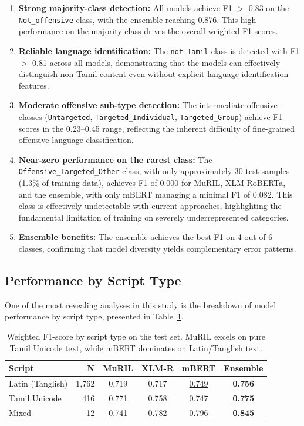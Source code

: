\documentclass[12pt, a4paper]{article}
\begin{document}
\begin{enumerate}[leftmargin=2em]
    \item \textbf{Strong majority-class detection:} All models achieve F1 $>$ 0.83 on the \texttt{Not\_offensive} class, with the ensemble reaching 0.876. This high performance on the majority class drives the overall weighted F1-scores.
    
    \item \textbf{Reliable language identification:} The \texttt{not-Tamil} class is detected with F1 $>$ 0.81 across all models, demonstrating that the models can effectively distinguish non-Tamil content even without explicit language identification features.
    
    \item \textbf{Moderate offensive sub-type detection:} The intermediate offensive classes (\texttt{Untargeted}, \texttt{Targeted\_Individual}, \texttt{Targeted\_Group}) achieve F1-scores in the 0.23--0.45 range, reflecting the inherent difficulty of fine-grained offensive language classification.
    
    \item \textbf{Near-zero performance on the rarest class:} The \texttt{Offensive\_Targeted\_Other} class, with only approximately 30 test samples (1.3\% of training data), achieves F1 of 0.000 for MuRIL, XLM-RoBERTa, and the ensemble, with only mBERT managing a minimal F1 of 0.082. This class is effectively undetectable with current approaches, highlighting the fundamental limitation of training on severely underrepresented categories.
    
    \item \textbf{Ensemble benefits:} The ensemble achieves the best F1 on 4 out of 6 classes, confirming that model diversity yields complementary error patterns.
\end{enumerate}

\subsection{Performance by Script Type}

One of the most revealing analyses in this study is the breakdown of model performance by script type, presented in Table~\ref{tab:script_performance}.

\begin{table}[!htbp]
\centering
\caption{Weighted F1-score by script type on the test set. MuRIL excels on pure Tamil Unicode text, while mBERT dominates on Latin/Tanglish text.}
\label{tab:script_performance}
\begin{tabular}{l r c c c c}
\toprule
\textbf{Script} & \textbf{N} & \textbf{MuRIL} & \textbf{XLM-R} & \textbf{mBERT} & \textbf{Ensemble} \\
\midrule
Latin (Tanglish) & 1,762 & 0.719 & 0.717 & \underline{0.749} & \textbf{0.756} \\
Tamil Unicode    & 416   & \underline{0.771} & 0.758 & 0.747 & \textbf{0.775} \\
Mixed            & 12    & 0.741 & 0.782 & \underline{0.796} & \textbf{0.845} \\
\bottomrule
\end{tabular}
\end{table}
\end{document}
